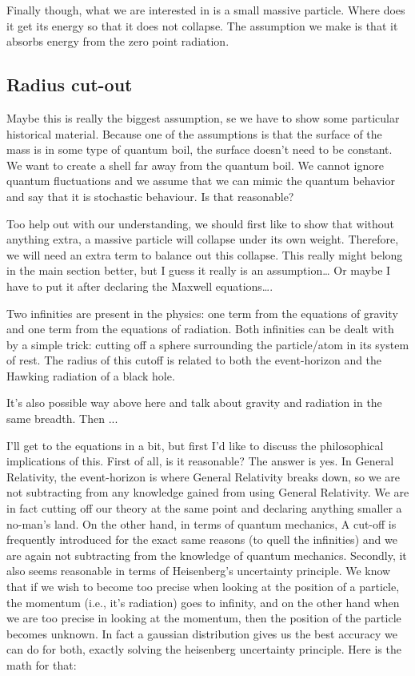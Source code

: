 \documentclass {article}
\begin{document}
Finally though, what we are interested in is a small massive particle. Where does it get its energy so that it does not collapse. The assumption we make is that it absorbs energy from the zero point radiation. 

\subsection{Radius cut-out}

Maybe this is really the biggest assumption, se we have to show some particular historical material. Because one of the assumptions is that the surface of the mass is in some type of quantum boil, the surface doesn’t need to be constant. We want to create a shell far away from the quantum boil. We cannot ignore quantum fluctuations and we assume that we can mimic the quantum behavior and say that it is stochastic behaviour. Is that reasonable?

Too help out with our understanding, we should first like to show that without anything extra, a massive particle will collapse under its own weight. Therefore, we will need an extra term to balance out this collapse. This really might belong in the main section better, but I guess it really is an assumption… Or maybe I have to put it after declaring the Maxwell equations…. 

Two infinities are present in the physics: one term from the equations of gravity and one term from the equations of radiation. Both infinities can be dealt with by a simple trick: cutting off a sphere surrounding the particle/atom in its system of rest. The radius of this cutoff is related to both the event-horizon and the Hawking radiation of a black hole.

It’s also possible way above here and talk about gravity and radiation in the same breadth. Then ...

I’ll get to the equations in a bit, but first I’d like to discuss the philosophical implications of this. First of all, is it reasonable? The answer is yes. In General Relativity, the event-horizon is where General Relativity breaks down, so we are not subtracting from any knowledge gained from using General Relativity. We are in fact cutting off our theory at the same point and declaring anything smaller a no-man’s land. On the other hand, in terms of quantum mechanics, A cut-off is frequently introduced for the exact same reasons (to quell the infinities) and we are again not subtracting from the knowledge of quantum mechanics. Secondly, it also seems reasonable in terms of Heisenberg’s uncertainty principle. We know that if we wish to become too precise when looking at the position of a particle, the momentum (i.e., it’s radiation) goes to infinity, and on the other hand when we are too precise in looking at the momentum, then the position of the particle becomes unknown. In fact a gaussian distribution gives us the best accuracy we can do for both, exactly solving the heisenberg uncertainty principle. Here is the math for that:
\end{document}
